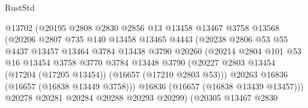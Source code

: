\begin{lexlean}{RustStd}
\begin{coremodule}
                                @13702
                                (@20195
                                  @2808
                                  @2830
                                  @2856
                                  @13
                                  @13458
                                  @13467
                                  @3758
                                  @13568
                                  (@20206
                                    @2807
                                    @735
                                    @140
                                    @13458
                                    @13465
                                    @4443
                                    (@20238
                                      @2806
                                      @53
                                      @55
                                      @4437
                                      @13457
                                      @13464
                                      @3784
                                      @13438
                                      @3790
                                      @20260
                                      (@20214
                                        @2804
                                        @101
                                        @53
                                        @16
                                        @13454
                                        @3758
                                        @3770
                                        @3784
                                        @13448
                                        @3790
                                        (@20227
                                          @2803
                                          @13454
                                          (@17204 (@17205 @13454))
                                          (@16657 (@17210 @2803 @53)))
                                        @20263
                                        @16836
                                        (@16657 (@16838 @13449 @3758)))
                                      @16836
                                      (@16657 (@16838 @13439 @13457)))
                                    @20278
                                    @20281
                                    @20284
                                    @20288
                                    @20293
                                    @20299)
                                  (@20305
                                    @13467
                                    @2830

\end{coremodule}
\end{lexlean}
